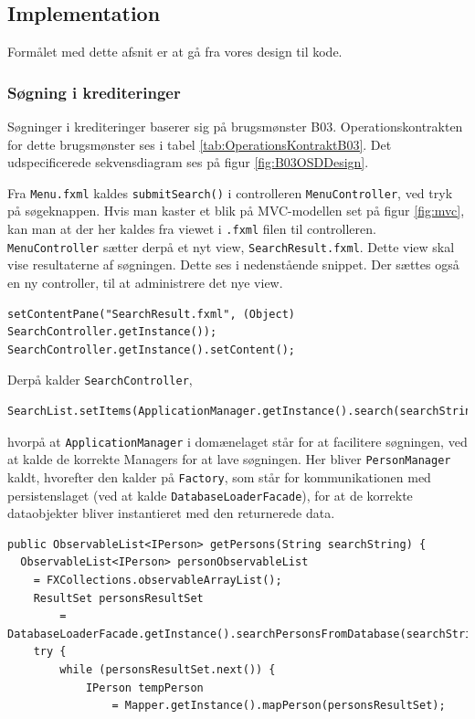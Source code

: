 \subsection{Implementation}

Formålet med dette afsnit er at gå fra vores design til kode.

\subsubsection{Søgning i krediteringer}%
\label{ssub:sogning_i_krediteringer}

Søgninger i krediteringer baserer sig på brugsmønster B03. Operationskontrakten
for dette brugsmønster ses i tabel \ref{tab:OperationsKontraktB03}. Det
udspecificerede sekvensdiagram ses på figur \ref{fig:B03OSDDesign}.

Fra \texttt{Menu.fxml} kaldes \texttt{submitSearch()} i controlleren
\texttt{MenuController}, ved tryk på søgeknappen. Hvis man kaster et blik på
MVC-modellen set på figur \ref{fig:mvc}, kan man at der her kaldes fra viewet i
\texttt{.fxml} filen til controlleren. \texttt{MenuController} sætter derpå et
nyt view, \texttt{SearchResult.fxml}. Dette view skal vise resultaterne af
søgningen. Dette ses i nedenstående snippet. Der sættes også en ny controller,
til at administrere det nye view.

\begin{lstlisting}
setContentPane("SearchResult.fxml", (Object) SearchController.getInstance());
SearchController.getInstance().setContent();
\end{lstlisting}

Derpå kalder \texttt{SearchController},

\begin{lstlisting}
SearchList.setItems(ApplicationManager.getInstance().search(searchString));
\end{lstlisting}

hvorpå at \texttt{ApplicationManager} i domænelaget står for at facilitere
søgningen, ved at kalde de korrekte Managers for at lave søgningen. Her bliver
\texttt{PersonManager} kaldt, hvorefter den kalder på \texttt{Factory}, som står
for kommunikationen med persistenslaget (ved at kalde
\texttt{DatabaseLoaderFacade}), for at de korrekte dataobjekter bliver
instantieret med den returnerede data. 

\begin{lstlisting}[basicstyle=\ttfamily\footnotesize, firstnumber=31,
label=lis:factory, caption=Forspørgsel til
persistenslaget og konstruktion af dataobjekter (\texttt{Factory.java})]
public ObservableList<IPerson> getPersons(String searchString) {
  ObservableList<IPerson> personObservableList 
    = FXCollections.observableArrayList();
    ResultSet personsResultSet 
        = DatabaseLoaderFacade.getInstance().searchPersonsFromDatabase(searchString);
    try {
        while (personsResultSet.next()) {
            IPerson tempPerson 
                = Mapper.getInstance().mapPerson(personsResultSet);
\end{lstlisting}

